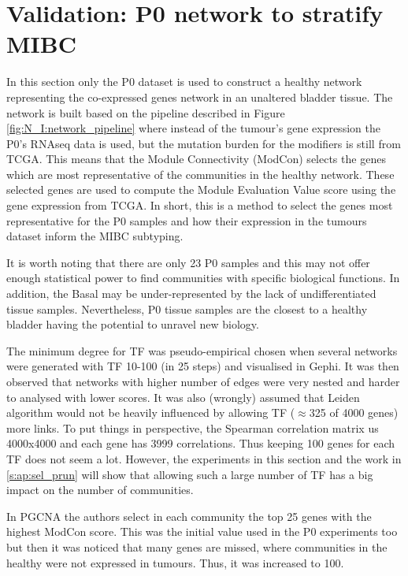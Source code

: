

\section{Validation: P0 network to stratify MIBC} \label{s:p0}

 


In this section only the P0 dataset is used to construct a healthy network representing the co-expressed genes network in an unaltered bladder tissue. The network is built based on the pipeline described in Figure \ref{fig:N_I:network_pipeline} where instead of the tumour's gene expression the P0's RNAseq data is used, but the mutation burden for the modifiers is still from TCGA. This means that the Module Connectivity (ModCon) selects the genes which are most representative of the communities in the healthy network. These selected genes are used to compute the Module Evaluation Value score using the gene expression from TCGA. In short, this is a method to select the genes most representative for the P0 samples and how their expression in the tumours dataset inform the MIBC subtyping. 

It is worth noting that there are only 23 P0 samples and this may not offer enough statistical power to find communities with specific biological functions. In addition, the Basal may be under-represented by the lack of undifferentiated tissue samples. Nevertheless, P0 tissue samples are the closest to a healthy bladder having the potential to unravel new biology.

The minimum degree for TF was pseudo-empirical chosen when several networks were generated with TF 10-100 (in 25 steps) and visualised in Gephi. It was then observed that networks with higher number of edges were very nested and harder to analysed with lower scores. It was also (wrongly) assumed that Leiden algorithm would not be heavily influenced by allowing TF ($\approx$325 of 4000 genes) more links. To put things in perspective, the Spearman correlation matrix us 4000x4000 and each gene has 3999 correlations. Thus keeping 100 genes for each TF does not seem a lot. However, the experiments in this section and the work in \cref{s:ap:sel_prun} will show that allowing such a large number of TF has a big impact on the number of communities.

In PGCNA \citet{Care2019-ij} the authors select in each community the top 25 genes with the highest ModCon score. This was the initial value used in the P0 experiments too but then it was noticed that many genes are missed, where communities in the healthy were not expressed in tumours. Thus, it was increased to 100.

